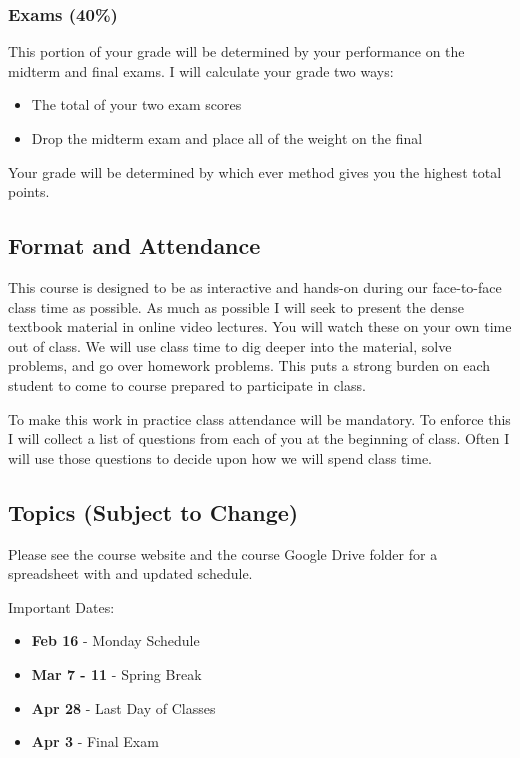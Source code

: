 \documentclass[]{article}
\begin{document}
\subsubsection{Exams (40\%)}\label{exams-40}

This portion of your grade will be determined by your performance on the
midterm and final exams. I will calculate your grade two ways:

\begin{itemize}
\itemsep1pt\parskip0pt
\item
  The total of your two exam scores
\item
  Drop the midterm exam and place all of the weight on the final
\end{itemize}

Your grade will be determined by which ever method gives you the highest
total points.

\subsection{Format and Attendance}\label{format}

This course is designed to be as interactive and hands-on during our face-to-face class time as possible. As much as possible
I will seek to present the dense textbook material in online video lectures. You will watch these on your own time out of class.
We will use class time to dig deeper into the material, solve problems, and go over homework problems. This puts a strong burden
on each student to come to course prepared to participate in class. 

To make this work in practice class attendance will be mandatory. To enforce this I will collect a list of questions from each of you
at the beginning of class. Often I will use those questions to decide upon how we will spend class time. 

\newpage
\subsection{Topics (Subject to Change)}\label{topics-subject-to-change}

Please see the course website and the course Google Drive folder for a spreadsheet with
and updated schedule.


Important Dates:

\begin{itemize}
\itemsep1pt\parskip0pt
\item
  \textbf{Feb 16} - Monday Schedule
\item
  \textbf{Mar 7 - 11} - Spring Break
\item
  \textbf{Apr 28} - Last Day of Classes
\item
  \textbf{Apr 3} - Final Exam
\end{itemize}
\end{document}
